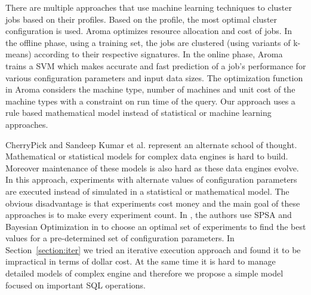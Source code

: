 There are multiple approaches \cite{wu2013self} \cite{lama2012aroma} that use machine learning techniques
to cluster jobs based on their profiles. Based on the profile, the most optimal cluster configuration is
used. Aroma \cite{lama2012aroma} optimizes resource allocation and cost of jobs. In
the offline phase, using a training set, the jobs are clustered
(using variants of k-means) according to their respective signatures.
In the online phase, Aroma trains a SVM which makes
accurate and fast prediction of a job's performance for various
configuration parameters and input data sizes. The optimization function in Aroma considers
the machine type, number of machines and unit cost of the machine types with a constraint on
run time of the query. Our approach uses a rule based mathematical model instead of statistical or machine learning approaches. 
 
CherryPick\cite{Li:2014:MMO:2600212.2600229} and Sandeep Kumar et al.\cite{KumarPLPGB16} represent an alternate school of thought.
Mathematical or statistical models for complex data engines is hard to build. Moreover maintenance of these models 
is also hard as these data engines evolve. In this approach, experiments
with alternate values of configuration parameters are executed instead of simulated in a 
statistical or mathematical model. The obvious disadvantage is that experiments cost money and the main 
goal of these approaches is to make every experiment count. In \cite{KumarPLPGB16}, the authors use SPSA and Bayesian Optimization in \cite{Li:2014:MMO:2600212.2600229} 
to choose an optimal set of experiments to find the best values for a pre-determined set of configuration parameters.
In Section~\ref{section:iter} we tried an iterative execution approach and found it to be impractical in terms of dollar cost. 
At the same time it is hard to manage detailed models of complex engine and therefore
we propose a simple model focused on important SQL operations.
  
